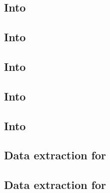 \subsection{Into \wcpMod{}                        \lispTodo{}}        \label{rlp auth: lookup: into wcp}                   
\subsection{Into \rlpUtilsMod{}                   \lispTodo{}}        \label{rlp auth: lookup: into rlp utils}             
\subsection{Into \userTxnDataMod{}                \lispTodo{}}        \label{rlp auth: lookup: into txn data}              
\subsection{Into \btcMod{}                        \lispTodo{}}        \label{rlp auth: lookup: into block data}            
\subsection{Into \hubMod{}                        \lispTodo{}}        \label{rlp auth: lookup: into hub}                   
\subsection{Data extraction for      \lispTodo{}}        \label{rlp auth: lookup: extraction for keccak}      
\subsection{Data extraction for \macroEcrecover{} \lispTodo{}}        \label{rlp auth: lookup: extraction for ecrecover}   
